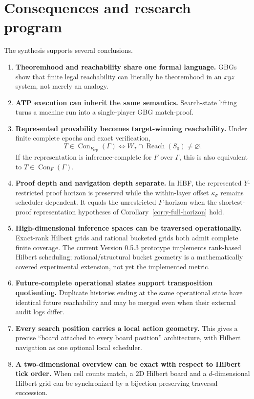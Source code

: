 \documentclass[11pt]{article}
\theoremstyle{definition}
\newcommand{\Con}{\operatorname{Con}}
\newcommand{\Reach}{\operatorname{Reach}}
\begin{document}
\section{Consequences and research program}

The synthesis supports several conclusions.

\begin{enumerate}[leftmargin=2em]
\item \textbf{Theoremhood and reachability share one formal language.} GBGs show that finite legal reachability can literally be theoremhood in an $xyz$ system, not merely an analogy.

\item \textbf{ATP execution can inherit the same semantics.} Search-state lifting turns a machine run into a single-player GBG match-proof.

\item \textbf{Represented provability becomes target-winning reachability.} Under finite complete epochs and exact verification,
\[
T\in\Con_{F_{\mathrm{rep}}}(\Gamma)
\Longleftrightarrow
W_T\cap\Reach(S_0)\neq\varnothing.
\]
If the representation is inference-complete for $F$ over $\Gamma$, this is also equivalent to $T\in\Con_F(\Gamma)$.

\item \textbf{Proof depth and navigation depth separate.} In HBF, the represented $Y$-restricted proof horizon is preserved while the within-layer offset $\kappa_\sigma$ remains scheduler dependent. It equals the unrestricted $F$-horizon when the shortest-proof representation hypotheses of Corollary~\ref{cor:y-full-horizon} hold.

\item \textbf{High-dimensional inference spaces can be traversed operationally.} Exact-rank Hilbert grids and rational bucketed grids both admit complete finite coverage. The current Version 0.5.3 prototype implements rank-based Hilbert scheduling; rational/structural bucket geometry is a mathematically covered experimental extension, not yet the implemented metric.

\item \textbf{Future-complete operational states support transposition quotienting.} Duplicate histories ending at the same operational state have identical future reachability and may be merged even when their external audit logs differ.

\item \textbf{Every search position carries a local action geometry.} This gives a precise ``board attached to every board position'' architecture, with Hilbert navigation as one optional local scheduler.

\item \textbf{A two-dimensional overview can be exact with respect to Hilbert tick order.} When cell counts match, a $2$D Hilbert board and a $d$-dimensional Hilbert grid can be synchronized by a bijection preserving traversal succession.
\end{enumerate}
\end{document}
